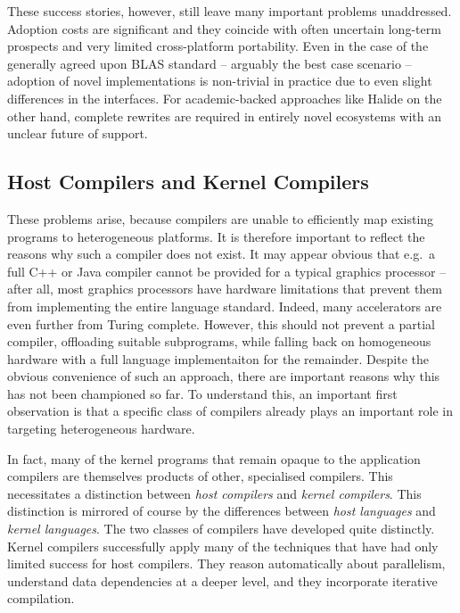     These success stories, however, still leave many important problems
    unaddressed.
    Adoption costs are significant and they coincide with often uncertain
    long-term prospects and very limited cross-platform portability.
    Even in the case of the generally agreed upon BLAS standard -- arguably the
    best case scenario -- adoption of novel implementations is non-trivial in
    practice due to even slight differences in the interfaces.
    For academic-backed approaches like Halide on the other hand, complete
    rewrites are required in entirely novel ecosystems with an unclear future of
    support.

\subsection*{Host Compilers and Kernel Compilers}

    These problems arise, because compilers are unable to efficiently map
    existing programs to heterogeneous platforms.
    It is therefore important to reflect the reasons why such a compiler
    does not exist.
    It may appear obvious that e.g.\ a full C++ or Java compiler cannot be
    provided for a typical graphics processor -- after all, most graphics
    processors have hardware limitations that prevent them from implementing the
    entire language standard.
    Indeed, many accelerators are even further from Turing complete.
    However, this should not prevent a partial compiler, offloading suitable
    subprograms, while falling back on homogeneous hardware with a full language
    implementaiton for the remainder.
    Despite the obvious convenience of such an approach, there are important
    reasons why this has not been championed so far.
    To understand this, an important first observation is that a specific class
    of compilers already plays an important role in targeting heterogeneous
    hardware.

    In fact, many of the kernel programs that remain opaque to the application
    compilers are themselves products of other, specialised compilers.
    This necessitates a distinction between {\em host compilers} and {\em kernel
    compilers}.
    This distinction is mirrored of course by the differences between {\em host
    languages} and {\em kernel languages}.
    The two classes of compilers have developed quite distinctly.
    Kernel compilers successfully apply many of the techniques that have had
    only limited success for host compilers.
    They reason automatically about parallelism, understand data dependencies at
    a deeper level, and they incorporate iterative compilation.

